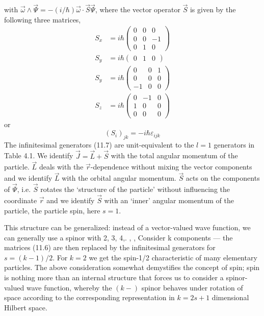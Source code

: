 with $\vec{\omega} \wedge \vec{\Psi}=-(i / \hbar) \vec{\omega} \cdot \vec{S} \vec{\Psi}$, where the vector operator $\vec{S}$ is given by the following three matrices,
\begin{equation}
\begin{aligned} S_{x} &=i \hbar\left(\begin{array}{ccc}{0} & {0} & {0} \\ {0} & {0} & {-1} \\ {0} & {1} & {0}\end{array}\right) \\ S_{y} &=i \hbar\left(\begin{array}{ccc}{0} & {1} & {0}\end{array}\right) \\ S_{y} &=i \hbar\left(\begin{array}{ccc}{0} & {0} & {1} \\ {0} & {0} & {0} \\ {-1} & {0} & {0}\end{array}\right) \\ S_{z} &=i \hbar\left(\begin{array}{ccc}{0} & {-1} & {0} \\ {1} & {0} & {0} \\ {0} & {0} & {0}\end{array}\right) \end{aligned}
\end{equation}
or
\begin{equation}
    \left(S_{i}\right)_{j k}=-i \hbar \varepsilon_{i j k}
    \end{equation}
The infinitesimal generators (11.7) are unit-equivalent to the $l = 1$ generators in Table 4.1. We identify $\vec{J}=\vec{L}+\vec{S}$ with the total angular momentum of the particle. $\vec{L}$ deals with the $\vec{r}$-dependence without mixing the vector components and we identify $\vec{L}$ with the orbital angular momentum. $\vec{S}$ acts on the components of $\vec{\Psi}$, i.e. $\vec{S}$ rotates the `structure of the particle' without influencing the coordinate $\vec{r}$ and we identify $\vec{S}$ with an `inner' angular momentum of the particle, the particle spin, here $s = 1$. \par This structure can be generalized: instead of a vector-valued wave function, we can generally use a spinor with 2, 3, 4,. , , Consider k components — the matrices (11.6) are then replaced by the infinitesimal generators for $s = (k - 1) / 2$. For $k = 2$ we get the spin-1/2 characteristic of many elementary particles. The above consideration somewhat demystifies the concept of spin; spin is nothing more than an internal structure that forces us to consider a spinor-valued wave function, whereby the $(k-)$ spinor behaves under rotation of space according to the corresponding representation in $k = 2s + 1$ dimensional Hilbert space.

